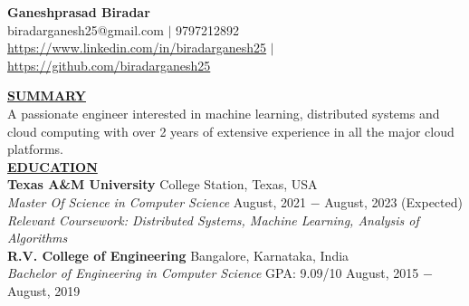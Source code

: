 \documentclass{article}
\begin{document}
\begin{center}
\large \textbf{Ganeshprasad Biradar \\}
\normalsize biradarganesh25@gmail.com $\mid$ 9797212892 \\ \url{https://www.linkedin.com/in/biradarganesh25} $\mid$ \url{https://github.com/biradarganesh25} \\
\hrulefill
\end{center}


\noindent \textbf{\underline{SUMMARY}} \\
\noindent A passionate engineer interested in machine learning, distributed systems and cloud computing with over 2 years of extensive experience in all the major cloud platforms. \\



\noindent \textbf{\underline{EDUCATION}} \\
\textbf{Texas A\&M University} \hfill College Station, Texas, USA \\
\textit{Master Of Science in Computer Science}  \hfill August, 2021 $-$ August, 2023 (Expected) \\
\textit{Relevant Coursework: Distributed Systems, Machine Learning, Analysis of Algorithms}\\

\noindent \textbf{R.V. College of Engineering} \hfill Bangalore, Karnataka, India \\
\textit{Bachelor of Engineering in Computer Science} \hspace{1.1cm} GPA: 9.09/10 \hfill August, 2015 $-$ August, 2019 \\
\end{document}
